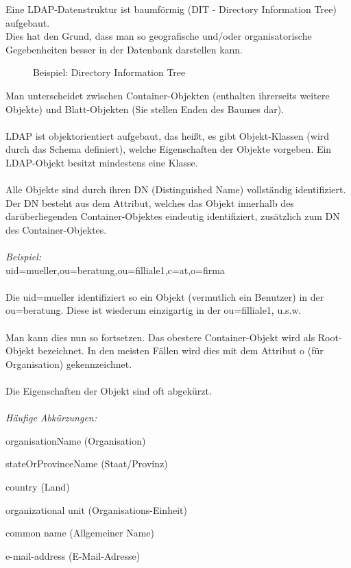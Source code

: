 Eine LDAP-Datenstruktur ist baumförmig (DIT - Directory Information Tree) aufgebaut.\\
Dies hat den Grund, dass man so geografische und/oder organisatorische Gegebenheiten besser in der Datenbank darstellen kann.
\\
\begin{figure}[H]
\centering
{}
\caption{Beispiel: Directory Information Tree}
\label{fig:content_ldap_dit}
\end{figure}
Man unterscheidet zwischen Container-Objekten (enthalten ihrerseits weitere Objekte) und Blatt-Objekten (Sie stellen Enden des Baumes dar).\\
\\
LDAP ist objektorientiert aufgebaut, das heißt, es gibt Objekt-Klassen (wird durch das Schema definiert), welche Eigenschaften der Objekte vorgeben. Ein LDAP-Objekt besitzt mindestens eine Klasse.\\
\\
Alle Objekte sind durch ihren DN (Distinguished Name) vollständig identifiziert. 
Der DN besteht aus dem Attribut, welches das Objekt innerhalb des darüberliegenden Container-Objektes eindeutig identifiziert, zusätzlich zum DN des Container-Objektes.\\
\\
\textit{Beispiel: }\\
uid=mueller,ou=beratung,ou=filliale1,c=at,o=firma\\
\\
Die uid=mueller identifiziert so ein Objekt (vermutlich ein Benutzer) in der ou=beratung. Diese ist wiederum einzigartig in der ou=filliale1, u.s.w.\\
\\
Man kann dies nun so fortsetzen. Das obestere Container-Objekt wird als Root-Objekt bezeichnet. In den meisten Fällen wird dies mit dem Attribut o (für Organisation) gekennzeichnet.\\
\\
Die Eigenschaften der Objekt sind oft abgekürzt.\\
\\
\textit{Häufige Abkürzungen:}\\
\begin{description}[style=nextline]
	\item[o]
		organisationName (Organisation)
	\item[st]
		stateOrProvinceName (Staat/Provinz)
	\item[c]
		country (Land)
	\item[ou]
		organizational unit (Organisations-Einheit)
	\item[cn]
		common name (Allgemeiner Name)
	\item[mail]
		e-mail-address (E-Mail-Adresse)
\end{description}

